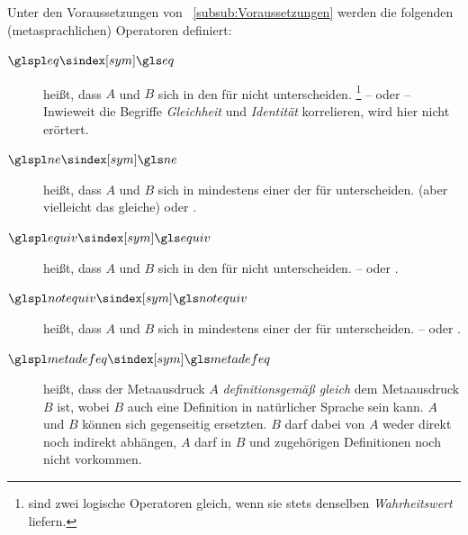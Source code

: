 Unter den Voraussetzungen von \subsubsectionname~\vref{subsub:Voraussetzungen} werden die folgenden (metasprachlichen) Operatoren definiert:
\begin{description}
	\item[$\glsSym{eq}$~~\emph{}]\label{def:Gleichheit}
	 heißt, dass $A$ und $B$ sich in den  für \symqt{$=$} nicht unterscheiden.%
	\footnote{%
		\textZB sind zwei logische Operatoren gleich, wenn sie stets denselben \emph{\gls{Wahrheitswert}} liefern.
	}
	--  oder 
	-- Inwieweit die Begriffe \emph{Gleichheit} und \emph{Identität} korrelieren, wird hier nicht erörtert. \seename~\cite{bib:Identitaet}
	\item[$\glsSym{ne}$~~\emph{}]\label{def:Ungleichheit}
	 heißt, dass $A$ und $B$ sich in mindestens einer der  für \symqt{$=$} unterscheiden.  (aber vielleicht das gleiche) oder .
	\item[$\glsSym{equiv}$~~\emph{}]\label{def:Äquivalenz}
	 heißt, dass $A$ und $B$ sich in den  für \symqt{$\equiv$} nicht unterscheiden.
	--  oder .
	\item[$\glsSym{notequiv}$~~\emph{}]\label{def:Kontravalenz}
	 heißt, dass $A$ und $B$ sich in mindestens einer der  für \symqt{$\notequiv$} unterscheiden.
	--  oder .
	\item[$\glsSym{metadefeq}$~\emph{}]\label{def:Metadefinition}
	 heißt, dass der Metaausdruck $A$ \emph{definitionsgemäß gleich} dem Metaausdruck $B$ ist, wobei $B$ auch eine Definition in natürlicher Sprache sein kann.
	$A$ und $B$ können sich gegenseitig ersetzten.
	$B$ darf dabei von $A$ weder direkt noch indirekt abhängen, \textdh $A$ darf in $B$ und zugehörigen Definitionen noch nicht vorkommen.


\end{description}

